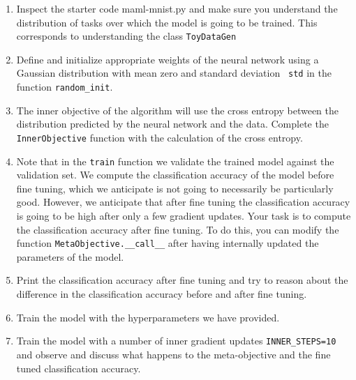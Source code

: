 \documentclass[11pt]{article}
\begin{document}
\begin{enumerate}
\begin{enumerate}

    \item Inspect the starter code maml-mnist.py and make sure you understand the distribution of tasks over which the model is going to be trained. This corresponds to understanding the class \verb+ToyDataGen+
    \item Define and initialize appropriate weights of the neural network using a Gaussian distribution with mean zero and standard deviation \verb+ std+ in
    the function \verb+random_init+.
    \item The inner objective of the algorithm will use the cross entropy between the distribution predicted by the neural network and the data. Complete the \verb+InnerObjective+ function with the calculation of the cross entropy. 
    \item Note that in the \verb+train+ function we validate the trained model against the validation set. We compute the classification accuracy of the model before fine tuning, which we anticipate is not going to necessarily be particularly good. However, we anticipate that after fine tuning the
    classification accuracy is going to be high after only a few gradient updates. Your task is to compute the classification accuracy after fine tuning. To do this, you can modify the function \verb+MetaObjective.__call__+ after having internally updated the parameters of the model. 
    \item Print the classification accuracy after fine tuning and try to reason about the difference in the classification accuracy before and after fine tuning.
    \item Train the model with the hyperparameters we have provided. 
    \item Train the model with a number of inner gradient updates  \verb+INNER_STEPS=10+ and observe and discuss  what happens to the meta-objective and the fine tuned classification accuracy.   
    \end{enumerate}



\end{enumerate}
\end{document}

